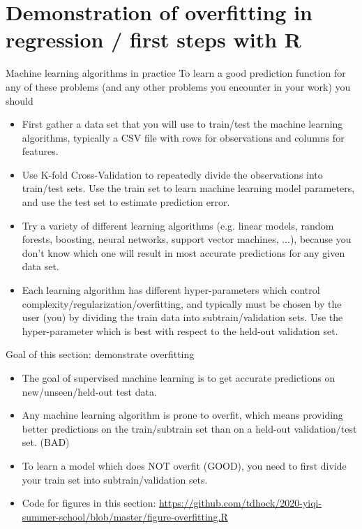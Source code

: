 \documentclass{article}
\begin{document}
\section{Demonstration of overfitting in regression /
  first steps with R}

{Machine learning algorithms in practice}
To learn a good prediction function for any of these problems (and
any other problems you encounter in your work) you should
\begin{itemize}
\item First gather a data set that you will use to train/test the
  machine learning algorithms, typically a CSV file with rows for
  observations and columns for features.
\item Use K-fold Cross-Validation to repeatedly divide the
  observations into train/test sets. Use the train set to learn
  machine learning model parameters, and use the test set to
  estimate prediction error.
\item Try a variety of different learning algorithms (e.g. linear
  models, random forests, boosting, neural networks, support vector
  machines, ...), because you don't know which one will result in
  most accurate predictions for any given data set. 
\item Each learning algorithm has different hyper-parameters which
  control complexity/regularization/overfitting, and typically must
  be chosen by the user (you) by dividing the train data into
  subtrain/validation sets. Use the hyper-parameter which is
  best with respect to the held-out validation set.
\end{itemize}

{Goal of this section: demonstrate overfitting}
\begin{itemize}
\item The goal of supervised machine learning is to get accurate
  predictions on new/unseen/held-out test data.
\item Any machine learning algorithm is prone to overfit, which
  means providing better predictions on the train/subtrain set than
  on a held-out validation/test set. (BAD)
\item To learn a model which does NOT overfit (GOOD), you need to
  first divide your train set into subtrain/validation sets.
\item Code for figures in this section:
  \url{https://github.com/tdhock/2020-yiqi-summer-school/blob/master/figure-overfitting.R}
\end{itemize}
\end{document}
